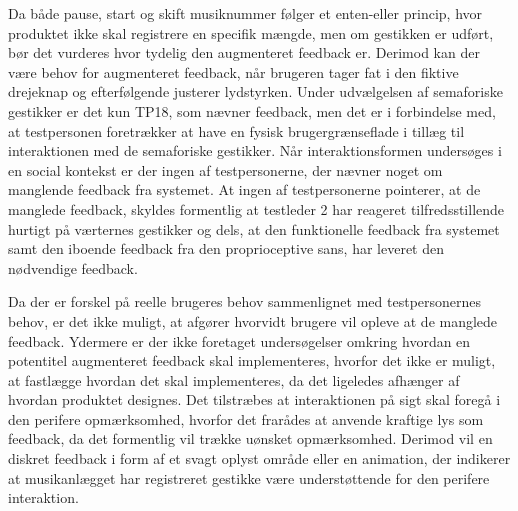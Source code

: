 Da både pause, start og skift musiknummer følger et enten-eller princip, hvor produktet ikke skal registrere en specifik mængde, men om gestikken er udført, bør det vurderes hvor tydelig den augmenteret feedback er. Derimod kan der være behov for augmenteret feedback, når brugeren tager fat i den fiktive drejeknap og efterfølgende justerer lydstyrken.\blankline
%
Under udvælgelsen af semaforiske gestikker er det kun TP18, som nævner feedback, men det er i forbindelse med, at testpersonen foretrækker at have en fysisk brugergrænseflade i tillæg til interaktionen med de semaforiske gestikker. Når interaktionsformen undersøges i en social kontekst er der ingen af testpersonerne, der nævner noget om manglende feedback fra systemet. At ingen af testpersonerne pointerer, at de manglede feedback, skyldes formentlig at testleder 2 har reageret tilfredsstillende hurtigt på værternes gestikker og dels, at den funktionelle feedback fra systemet samt den iboende feedback fra den proprioceptive sans, har leveret den nødvendige feedback.

Da der er forskel på reelle brugeres behov sammenlignet med testpersonernes behov, er det ikke muligt, at afgører hvorvidt brugere vil opleve at de manglede feedback. Ydermere er der ikke foretaget undersøgelser omkring hvordan en potentitel augmenteret feedback skal implementeres, hvorfor det ikke er muligt, at fastlægge hvordan det skal implementeres, da det ligeledes afhænger af hvordan produktet designes. Det tilstræbes at interaktionen på sigt skal foregå i den perifere opmærksomhed, hvorfor det frarådes at anvende kraftige lys som feedback, da det formentlig vil trække uønsket opmærksomhed. Derimod vil en diskret feedback i form af et svagt oplyst område eller en animation, der indikerer at musikanlægget har registreret gestikke være understøttende for den perifere interaktion.
%

